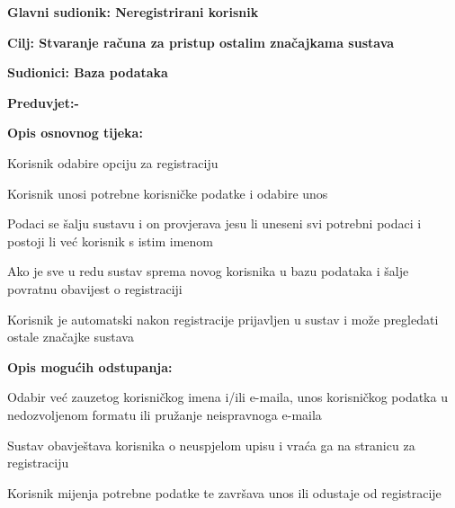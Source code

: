 					
				\noindent {}
				\begin{packed_item}
					
					\item \textbf{Glavni sudionik: Neregistrirani korisnik}
					\item  \textbf{Cilj: Stvaranje računa za pristup ostalim značajkama sustava}  
					\item  \textbf{Sudionici: Baza podataka} 
					\item  \textbf{Preduvjet:-} 
					\item  \textbf{Opis osnovnog tijeka:}
					
					\item[] \begin{packed_enum}
						
						\item Korisnik odabire opciju za registraciju
						\item Korisnik unosi potrebne korisničke podatke i odabire unos
						\item Podaci se šalju sustavu i on provjerava jesu li uneseni svi potrebni podaci i postoji li već korisnik s istim imenom
						\item Ako je sve u redu sustav sprema novog korisnika u bazu podataka i šalje povratnu obavijest o registraciji 
						\item Korisnik je automatski nakon registracije prijavljen u sustav i može pregledati ostale značajke sustava
					\end{packed_enum}
					
					\item  \textbf{Opis mogućih odstupanja:}
					
					\item[] \begin{packed_item}
						
						\item[2.a] Odabir već zauzetog korisničkog imena i/ili e-maila, unos korisničkog podatka u nedozvoljenom formatu ili pružanje neispravnoga e-maila
						\item[] \begin{packed_enum}
							
							\item  Sustav obavještava korisnika o neuspjelom upisu i vraća ga na stranicu za registraciju
							\item Korisnik mijenja potrebne podatke te završava unos ili odustaje od registracije
							
						\end{packed_enum}
						
					\end{packed_item}
				\end{packed_item}
				
